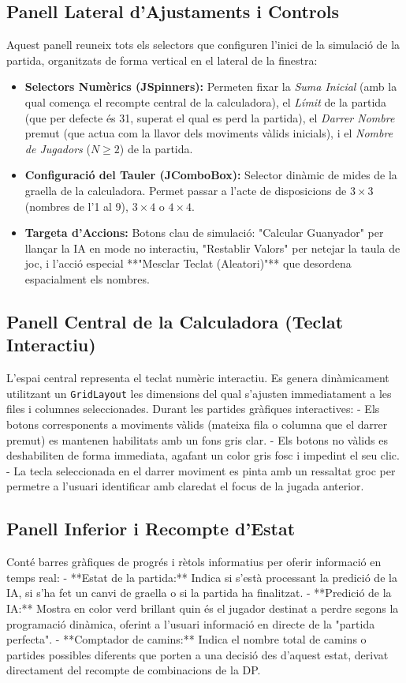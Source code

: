 \documentclass[compsoc, a4paper]{IEEEtran}
\begin{document}
\subsection{Panell Lateral d'Ajustaments i Controls}
Aquest panell reuneix tots els selectors que configuren l'inici de la simulació de la partida, organitzats de forma vertical en el lateral de la finestra:
\begin{itemize}
    \item \textbf{Selectors Numèrics (JSpinners):} Permeten fixar la \textit{Suma Inicial} (amb la qual comença el recompte central de la calculadora), el \textit{Límit} de la partida (que per defecte és 31, superat el qual es perd la partida), el \textit{Darrer Nombre} premut (que actua com la llavor dels moviments vàlids inicials), i el \textit{Nombre de Jugadors} ($N \ge 2$) de la partida.
    \item \textbf{Configuració del Tauler (JComboBox):} Selector dinàmic de mides de la graella de la calculadora. Permet passar a l'acte de disposicions de $3 \times 3$ (nombres de l'1 al 9), $3 \times 4$ o $4 \times 4$.
    \item \textbf{Targeta d'Accions:} Botons clau de simulació: "Calcular Guanyador" per llançar la IA en mode no interactiu, "Restablir Valors" per netejar la taula de joc, i l'acció especial **"Mesclar Teclat (Aleatori)"** que desordena espacialment els nombres.
\end{itemize}

\subsection{Panell Central de la Calculadora (Teclat Interactiu)}
L'espai central representa el teclat numèric interactiu. Es genera dinàmicament utilitzant un \texttt{GridLayout} les dimensions del qual s'ajusten immediatament a les files i columnes seleccionades. 
Durant les partides gràfiques interactives:
- Els botons corresponents a moviments vàlids (mateixa fila o columna que el darrer premut) es mantenen habilitats amb un fons gris clar.
- Els botons no vàlids es deshabiliten de forma immediata, agafant un color gris fosc i impedint el seu clic.
- La tecla seleccionada en el darrer moviment es pinta amb un ressaltat groc per permetre a l'usuari identificar amb claredat el focus de la jugada anterior.

\subsection{Panell Inferior i Recompte d'Estat}
Conté barres gràfiques de progrés i rètols informatius per oferir informació en temps real:
- **Estat de la partida:** Indica si s'està processant la predició de la IA, si s'ha fet un canvi de graella o si la partida ha finalitzat.
- **Predició de la IA:** Mostra en color verd brillant quin és el jugador destinat a perdre segons la programació dinàmica, oferint a l'usuari informació en directe de la "partida perfecta".
- **Comptador de camins:** Indica el nombre total de camins o partides possibles diferents que porten a una decisió des d'aquest estat, derivat directament del recompte de combinacions de la DP.
\end{document}
